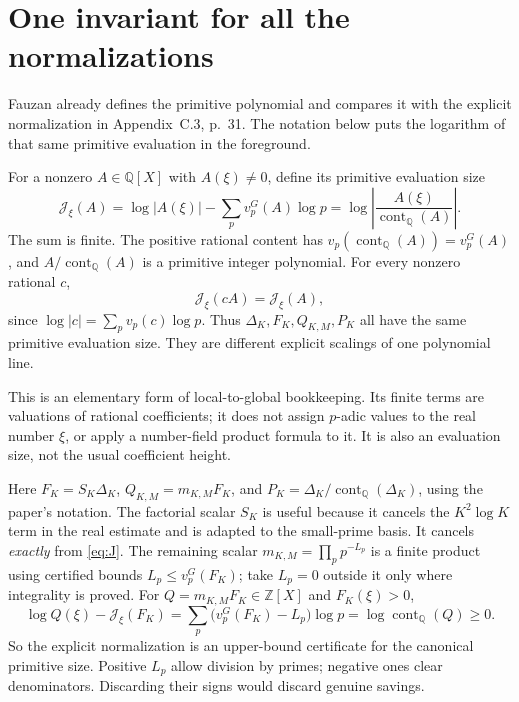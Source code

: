 \documentclass[11pt]{article}
\theoremstyle{definition}
\theoremstyle{remark}\newtheorem*{remark}{Remark}
\newcommand{\Q}{\mathbb Q}
\newcommand{\Z}{\mathbb Z}
\newcommand{\cont}{\operatorname{cont}_{\Q}}
\begin{document}
\section{One invariant for all the normalizations}

Fauzan already defines the primitive polynomial and compares it with the
explicit normalization in Appendix~C.3, p.~31. The notation below puts the
logarithm of that same primitive evaluation in the foreground.

For a nonzero $A\in\Q[X]$ with $A(\xi)\ne0$, define its primitive evaluation size
\begin{equation}\label{eq:J}
 \mathcal J_\xi(A)=\log|A(\xi)|-
                  \sum_p v_p^G(A)\log p
 =\log\left|\frac{A(\xi)}{\cont(A)}\right|.
\end{equation}
The sum is finite. The positive rational content has
$v_p(\cont(A))=v_p^G(A)$, and $A/\cont(A)$ is a primitive integer polynomial.
For every nonzero rational $c$,
\begin{equation}\label{eq:invariant}
 \mathcal J_\xi(cA)=\mathcal J_\xi(A),
\end{equation}
since $\log|c|=\sum_pv_p(c)\log p$. Thus $\Delta_K,F_K,Q_{K,M},P_K$
all have the same primitive evaluation size. They are different explicit
scalings of one polynomial line.

This is an elementary form of local-to-global bookkeeping. Its finite terms
are valuations of rational coefficients; it does not assign $p$-adic values
to the real number $\xi$, or apply a number-field product formula to it.
It is also an evaluation size, not the usual coefficient height.

Here $F_K=S_K\Delta_K$, $Q_{K,M}=m_{K,M}F_K$, and
$P_K=\Delta_K/\cont(\Delta_K)$, using the paper's notation.
The factorial scalar $S_K$ is useful because it cancels the $K^2\log K$ term
in the real estimate and is adapted to the small-prime basis. It cancels
\emph{exactly} from \eqref{eq:J}. The remaining scalar
$m_{K,M}=\prod_p p^{-L_p}$ is a finite product using certified bounds
$L_p\le v_p^G(F_K)$; take $L_p=0$ outside it only where integrality is proved.
For $Q=m_{K,M}F_K\in\Z[X]$ and $F_K(\xi)>0$,
\begin{equation}\label{eq:certified}
 \log Q(\xi)-\mathcal J_\xi(F_K)
 =\sum_p\bigl(v_p^G(F_K)-L_p\bigr)\log p
 =\log\cont(Q)\ge0.
\end{equation}
So the explicit normalization is an upper-bound certificate for the canonical
primitive size. Positive $L_p$ allow division by primes; negative ones clear
denominators. Discarding their signs would discard genuine savings.
\end{document}

